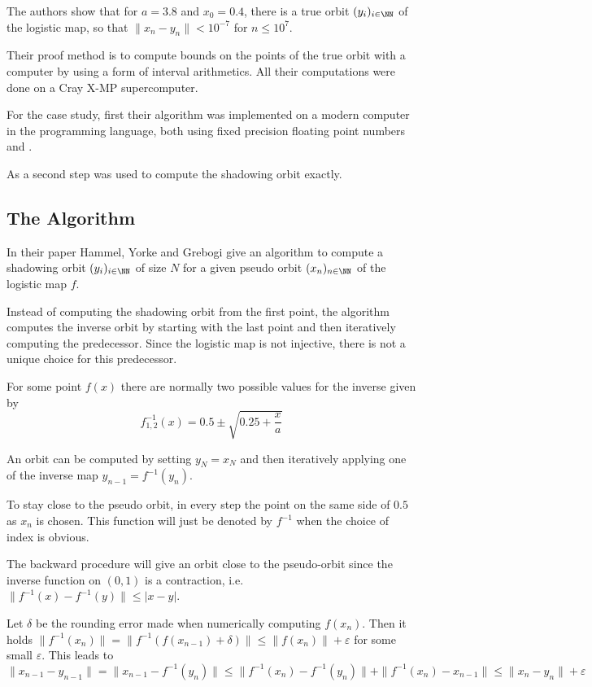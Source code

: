     The authors show that for $a = 3.8$ and $x_0 = 0.4$, there is a true orbit $(y_i)_{i \in \NN}$ of the logistic map, so that $\| x_n - y_n \| < 10^{-7}$ for $n \leq 10^7$.

    Their proof method is to compute bounds on the points of the true orbit with a computer by using a form of interval arithmetics. 
    All their computations were done on a Cray X-MP supercomputer. 

    For the case study, first their algorithm was implemented on a modern
    computer in the \cc programming language, both using fixed precision
    floating point numbers and \irram. 

    As a second step \irram was used to compute the shadowing orbit exactly.
  \subsection{The Algorithm}
    In their paper Hammel, Yorke and Grebogi give an algorithm to compute a
    shadowing orbit $(y_i)_{i \in \NN}$ of size $N$ for a given pseudo orbit
    $(x_n)_{n \in \NN}$ of the logistic map $f$.

    Instead of computing the shadowing orbit from the first point, the algorithm computes the inverse orbit by starting with the last point and then iteratively computing the predecessor. 
    Since the logistic map is not injective, there is not a unique choice for this predecessor. 

    For some point $f(x)$ there are normally two possible values for the
    inverse given by $$f^{-1}_{1,2}(x) = 0.5 \pm \sqrt{0.25 + \frac{x}{a}} $$

    An orbit can be computed by setting $y_N = x_N$ and then iteratively
    applying one of the inverse map $y_{n-1} = f^{-1}(y_n)$.  

    To stay close to the pseudo orbit, in every step the point on the same side
    of $0.5$ as $x_n$ is chosen.
    This function will just be denoted by $f^{-1}$ when the choice of index is
    obvious.
    
    The backward procedure will give an orbit close to the pseudo-orbit since the
    inverse function on $(0,1)$ is a contraction, i.e. $\| f^{-1}(x) -
    f^{-1}(y) \| \leq |x-y|$. 

    Let $\delta$ be the rounding error made when numerically computing
    $f(x_n)$.
    Then it holds $\|f^{-1}(x_n)\| = \| f^{-1}(f(x_{n-1})+\delta)\| \leq \|f(x_n)\| +
    \varepsilon$ for some small $\varepsilon$.   
    This leads to
    $$ \| x_{n-1} - y_{n-1} \| = \| x_{n-1} - f^{-1}(y_n) \| \leq \|
    f^{-1}(x_n) - f^{-1}(y_n) \| + \| f^{-1}(x_n) - x_{n-1} \| \leq \| x_n -
    y_n \| + \varepsilon $$   

